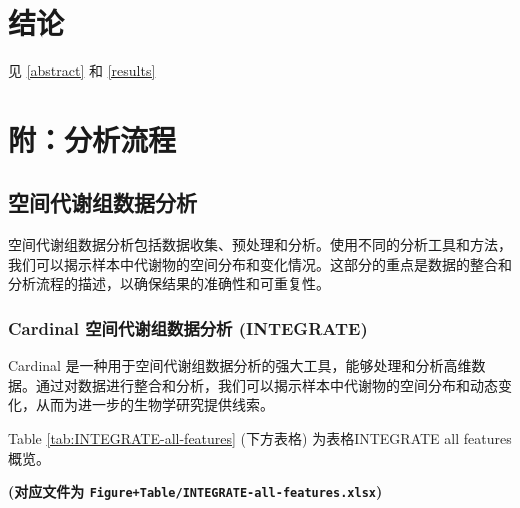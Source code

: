 \documentclass[
]{article}
\begin{document}
\begin{center}\vspace{1.5cm}\end{center}

\hypertarget{dis}{%
\section{结论}\label{dis}}

见 \ref{abstract} 和 \ref{results}

\newpage

\hypertarget{workflow}{%
\section{附：分析流程}\label{workflow}}

\hypertarget{ux7a7aux95f4ux4ee3ux8c22ux7ec4ux6570ux636eux5206ux6790}{%
\subsection{空间代谢组数据分析}\label{ux7a7aux95f4ux4ee3ux8c22ux7ec4ux6570ux636eux5206ux6790}}

空间代谢组数据分析包括数据收集、预处理和分析。使用不同的分析工具和方法，我们可以揭示样本中代谢物的空间分布和变化情况。这部分的重点是数据的整合和分析流程的描述，以确保结果的准确性和可重复性。

\hypertarget{cardinal-ux7a7aux95f4ux4ee3ux8c22ux7ec4ux6570ux636eux5206ux6790-integrate}{%
\subsubsection{Cardinal 空间代谢组数据分析 (INTEGRATE)}\label{cardinal-ux7a7aux95f4ux4ee3ux8c22ux7ec4ux6570ux636eux5206ux6790-integrate}}

Cardinal 是一种用于空间代谢组数据分析的强大工具，能够处理和分析高维数据。通过对数据进行整合和分析，我们可以揭示样本中代谢物的空间分布和动态变化，从而为进一步的生物学研究提供线索。

\begin{center}\vspace{1.5cm}\end{center}

Table \ref{tab:INTEGRATE-all-features} (下方表格) 为表格INTEGRATE all features概览。

\textbf{(对应文件为 \texttt{Figure+Table/INTEGRATE-all-features.xlsx})}
\end{document}

